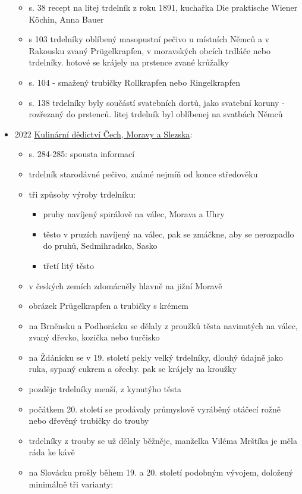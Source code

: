 \begin{itemize}
  \begin{itemize}
  \tightlist
  \item
    s. 38 recept na litej trdelník z roku 1891, kuchařka Die praktische
    Wiener Köchin, Anna Bauer
  \item
    s 103 trdelníky oblíbený masopustní pečivo u místních Němců a v
    Rakousku zvaný Prügelkrapfen, v moravských obcích trdláče nebo
    trdelníky. hotové se krájely na prstence zvané krůžalky
  \item
    s. 104 - smažený trubičky Rollkrapfen nebo Ringelkrapfen
  \item
    s. 138 trdelníky byly součástí svatebních dortů, jako svatební
    koruny - rozřezaný do prstenců. litej trdelník byl oblíbenej na
    svatbách Němců
  \end{itemize}
\item
  2022
  \href{https://kulturni-dejiny.slu.cz/data/uploads/067/upvysledky/067-2022-4-kulinarni_dedictvi_web_enc.pdf}{Kulinární
  dědictví Čech, Moravy a Slezska}:

  \begin{itemize}
  \tightlist
  \item
    s. 284-285: spousta informací
  \item
    trdelník starodávné pečivo, známé nejmíň od konce středověku
  \item
    tři způsoby výroby trdelníku:

    \begin{itemize}
    \tightlist
    \item
      pruhy navíjený spirálově na válec, Morava a Uhry
    \item
      těsto v pruzích navíjený na válec, pak se zmáčkne, aby se
      nerozpadlo do pruhů, Sedmihradsko, Sasko
    \item
      třetí litý těsto
    \end{itemize}
  \item
    v českých zemích zdomácněly hlavně na jižní Moravě
  \item
    obrázek Prügelkrapfen a trubičky s krémem
  \item
    na Brněnsku a Podhorácku se dělaly z proužků těsta navinutých na
    válec, zvaný dřevko, kozička nebo turčisko
  \item
    na Ždánicku se v 19. století pekly velký trdelníky, dlouhý údajně
    jako ruka, sypaný cukrem a ořechy. pak se krájely na kroužky
  \item
    pozdějc trdelníky menší, z kynutýho těsta
  \item
    počátkem 20. století se prodávaly průmyslově vyráběný otáčecí rožně
    nebo dřevěný trubičky do trouby
  \item
    trdelníky z trouby se už dělaly běžnějc, manželka Viléma Mrštíka je
    měla ráda ke kávě
  \item
    na Slovácku prošly během 19. a 20. století podobným vývojem,
    doložený minimálně tři varianty:


\end{itemize}
\end{itemize}
